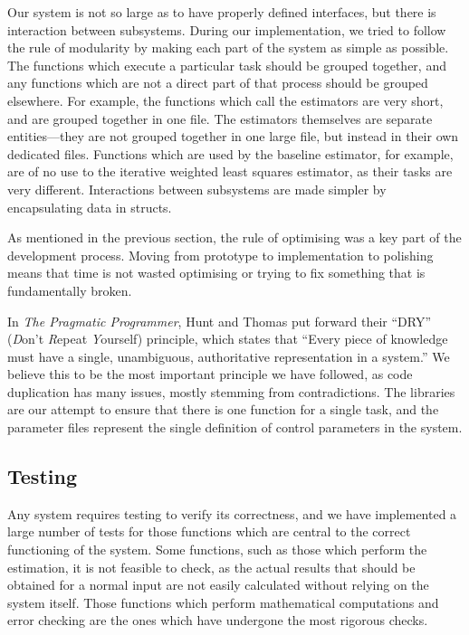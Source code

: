 \documentclass[a4paper,11pt,twoside]{article}
\begin{document}
   Our system is not so large as to have properly defined interfaces, but there
   is interaction between subsystems. During our implementation, we tried to
   follow the rule of modularity by making each part of the system as simple as
   possible. The functions which execute a particular task should be grouped
   together, and any functions which are not a direct part of that process
   should be grouped elsewhere. For example, the functions which call the
   estimators are very short, and are grouped together in one file. The
   estimators themselves are separate entities---they are not grouped together
   in one large file, but instead in their own dedicated files. Functions which
   are used by the baseline estimator, for example, are of no use to the
   iterative weighted least squares estimator, as their tasks are very
   different. Interactions between subsystems are made simpler by encapsulating
   data in structs.

   As mentioned in the previous section, the rule of optimising was a key part
   of the development process. Moving from prototype to implementation to
   polishing means that time is not wasted optimising or trying to fix something
   that is fundamentally broken.

   In \emph{The Pragmatic Programmer}, Hunt and Thomas put forward their ``DRY''
   (\emph{D}on't \emph{R}epeat \emph{Y}ourself) principle, which states that
   ``Every piece of knowledge must have a single, unambiguous, authoritative
   representation in a system.'' \cite{hunt1999pragmatic} We believe this to be
   the most important principle we have followed, as code duplication has many
   issues, mostly stemming from contradictions. The libraries are our attempt to
   ensure that there is one function for a single task, and the parameter files
   represent the single definition of control parameters in the system.
\subsection{Testing}
\label{sec-7-3}

   Any system requires testing to verify its correctness, and we have
   implemented a large number of tests for those functions which are central to
   the correct functioning of the system. Some functions, such as those which
   perform the estimation, it is not feasible to check, as the actual results
   that should be obtained for a normal input are not easily calculated without
   relying on the system itself. Those functions which perform mathematical
   computations and error checking are the ones which have undergone the most
   rigorous checks.
\end{document}
